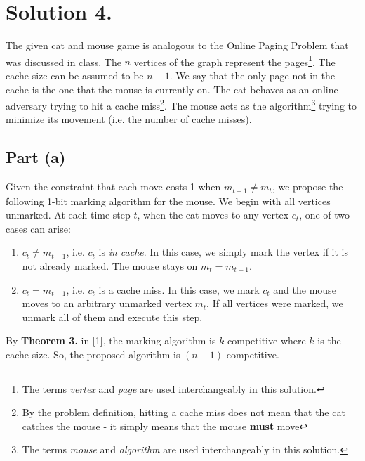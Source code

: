 \documentclass[11pt]{article}
\begin{document}
\section*{Solution 4.}
The given cat and mouse game is analogous to the Online Paging Problem that was
discussed in class. The $n$ vertices of the graph represent the pages\footnote{The
terms \textit{vertex} and \textit{page} are used interchangeably in this solution.}.
The cache size can be assumed to be $n-1$. We say that the only page not in the cache
is the one that the mouse is currently on. The cat behaves as an online adversary
trying to hit a cache miss\footnote{By the problem definition, hitting a cache miss
does not mean that the cat catches the mouse - it simply means that the mouse
\textbf{must} move}. The mouse acts as the algorithm\footnote{The terms \textit{mouse}
and \textit{algorithm} are used interchangeably in this solution.} trying to minimize
its movement (i.e. the number of cache misses).

\subsection*{Part (a)}
Given the constraint that each move costs 1 when $m_{t+1} \neq m_{t}$, we propose
the following 1-bit marking algorithm for the mouse. We begin with all vertices
unmarked. At each time step $t$, when the cat moves to any vertex $c_{t}$, one of
two cases can arise:
\begin{enumerate}
    \item $c_{t} \neq m_{t-1}$, i.e. $c_{t}$ is \textit{in cache}. In this case,
    we simply mark the vertex if it is not already marked. The mouse stays on
    $m_{t} = m_{t-1}$.
    \item $c_{t} = m_{t-1}$, i.e. $c_{t}$ is a cache miss. In this case, we mark
    $c_{t}$ and the mouse moves to an arbitrary unmarked vertex $m_{t}$. If all
    vertices were marked, we unmark all of them and execute this step.
\end{enumerate}
By \textbf{Theorem 3.} in [1], the marking algorithm is $k$-competitive where
$k$ is the cache size. So, the proposed algorithm is $(n-1)$-competitive.
\end{document}
